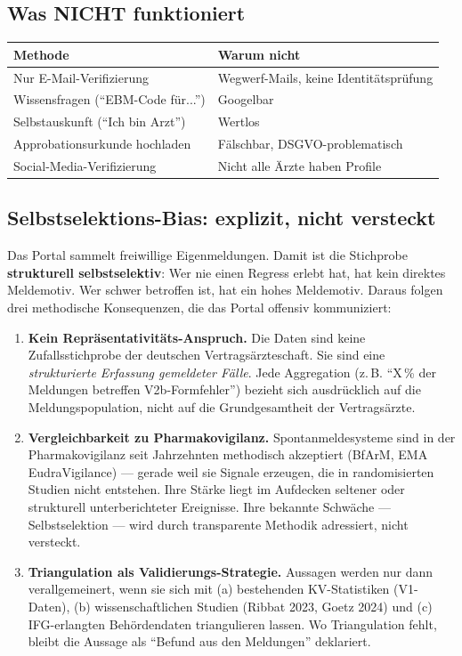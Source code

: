 \documentclass{umbruch-position}
\begin{document}
\subsection{Was NICHT funktioniert}

{\small
\begin{tabularx}{\textwidth}{X X}
\toprule
\textbf{Methode} & \textbf{Warum nicht} \\
\midrule
Nur E-Mail-Verifizierung & Wegwerf-Mails, keine Identitätsprüfung \\
Wissensfragen (``EBM-Code für...'') & Googelbar \\
Selbstauskunft (``Ich bin Arzt'') & Wertlos \\
Approbationsurkunde hochladen & Fälschbar, DSGVO-problematisch \\
Social-Media-Verifizierung & Nicht alle Ärzte haben Profile \\
\bottomrule
\end{tabularx}
}

\subsection{Selbstselektions-Bias: explizit, nicht versteckt}
\label{subsec:selbstselektion}

Das Portal sammelt freiwillige Eigenmeldungen. Damit ist die Stichprobe \textbf{strukturell selbstselektiv}: Wer nie einen Regress erlebt hat, hat kein direktes Meldemotiv. Wer schwer betroffen ist, hat ein hohes Meldemotiv. Daraus folgen drei methodische Konsequenzen, die das Portal offensiv kommuniziert:

\begin{enumerate}[nosep,leftmargin=*]
  \item \textbf{Kein Repräsentativitäts-Anspruch.} Die Daten sind keine Zufallsstichprobe der deutschen Vertragsärzteschaft. Sie sind eine \emph{strukturierte Erfassung gemeldeter Fälle}. Jede Aggregation (z.\,B. ``X\,\% der Meldungen betreffen V2b-Formfehler'') bezieht sich ausdrücklich auf die Meldungspopulation, nicht auf die Grundgesamtheit der Vertragsärzte.
  \item \textbf{Vergleichbarkeit zu Pharmakovigilanz.} Spontanmeldesysteme sind in der Pharmakovigilanz seit Jahrzehnten methodisch akzeptiert (BfArM, EMA EudraVigilance) --- gerade weil sie Signale erzeugen, die in randomisierten Studien nicht entstehen. Ihre Stärke liegt im Aufdecken seltener oder strukturell unterberichteter Ereignisse. Ihre bekannte Schwäche --- Selbstselektion --- wird durch transparente Methodik adressiert, nicht versteckt.
  \item \textbf{Triangulation als Validierungs-Strategie.} Aussagen werden nur dann verallgemeinert, wenn sie sich mit (a) bestehenden KV-Statistiken (V1-Daten), (b) wissenschaftlichen Studien (Ribbat 2023, Goetz 2024) und (c) IFG-erlangten Behördendaten triangulieren lassen. Wo Triangulation fehlt, bleibt die Aussage als ``Befund aus den Meldungen'' deklariert.
\end{enumerate}
\end{document}
